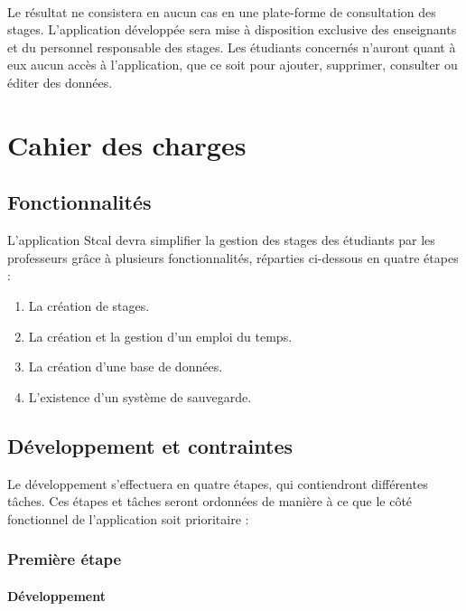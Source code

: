 \documentclass[a4paper,10pt]{report}
\begin{document}
  \paragraph{}
    Le résultat ne consistera en aucun cas en une plate-forme de consultation des stages.
    L'application développée sera mise à disposition exclusive des enseignants et du personnel responsable des stages. 
    Les étudiants concernés n'auront quant à eux aucun accès à l'application, que ce soit pour ajouter, supprimer, consulter ou éditer des données.
    
    
    
\part{Cahier des charges}
  
  \chapter{Fonctionnalités}

    L'application Stcal devra simplifier la gestion des stages des étudiants par les professeurs grâce à plusieurs fonctionnalités, réparties ci-dessous en quatre étapes  :

    \begin{enumerate}
      \item La création de stages.
      \item La création et la gestion d’un emploi du temps.
      \item La création d'une base de données. 
      \item L'existence d'un système de sauvegarde.
    \end{enumerate}
  
  

  \chapter{Développement et contraintes}

    Le développement s'effectuera en quatre étapes, qui contiendront différentes tâches. Ces étapes et tâches seront ordonnées de manière à ce que le côté fonctionnel de l'application soit prioritaire :

    \section{Première étape}

      \subsection{Développement}
\end{document}

